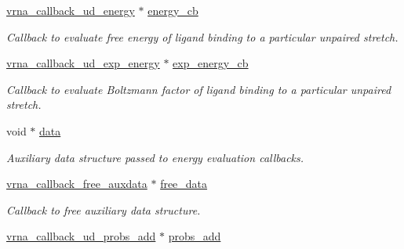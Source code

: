 \begin{DoxyCompactItemize}
\hyperlink{group__domains__up_ga75825c57d0bfde4ae4f95c044260c5c3}{vrna\+\_\+callback\+\_\+ud\+\_\+energy} $\ast$ \hyperlink{group__domains__up_a1efba765dd4ea893dc8bd7362761f99b}{energy\+\_\+cb}
\begin{DoxyCompactList}\small\item\em Callback to evaluate free energy of ligand binding to a particular unpaired stretch. \end{DoxyCompactList}\item 
\mbox{\label{group__domains__up_ad5aaa2530557880ae89e297f8f09aa55}} 
\hyperlink{group__domains__up_ga861706f257ba993753464b823e65b86e}{vrna\+\_\+callback\+\_\+ud\+\_\+exp\+\_\+energy} $\ast$ \hyperlink{group__domains__up_ad5aaa2530557880ae89e297f8f09aa55}{exp\+\_\+energy\+\_\+cb}
\begin{DoxyCompactList}\small\item\em Callback to evaluate Boltzmann factor of ligand binding to a particular unpaired stretch. \end{DoxyCompactList}\item 
\mbox{\label{group__domains__up_a8802b1b0512999a9f35202031811ce17}} 
void $\ast$ \hyperlink{group__domains__up_a8802b1b0512999a9f35202031811ce17}{data}
\begin{DoxyCompactList}\small\item\em Auxiliary data structure passed to energy evaluation callbacks. \end{DoxyCompactList}\item 
\mbox{\label{group__domains__up_a21b3084846902172858bc53f113d05a4}} 
\hyperlink{group__fold__compound_ga7806651f51b195013839a218b3bbd5a3}{vrna\+\_\+callback\+\_\+free\+\_\+auxdata} $\ast$ \hyperlink{group__domains__up_a21b3084846902172858bc53f113d05a4}{free\+\_\+data}
\begin{DoxyCompactList}\small\item\em Callback to free auxiliary data structure. \end{DoxyCompactList}\item 
\mbox{\label{group__domains__up_a457b43dfab7f4321b5d7a84e5deea5d7}} 
\hyperlink{group__domains__up_gab10498abc84fcaf336aca8f8d7d42eb2}{vrna\+\_\+callback\+\_\+ud\+\_\+probs\+\_\+add} $\ast$ \hyperlink{group__domains__up_a457b43dfab7f4321b5d7a84e5deea5d7}{probs\+\_\+add}

\end{DoxyCompactItemize}
